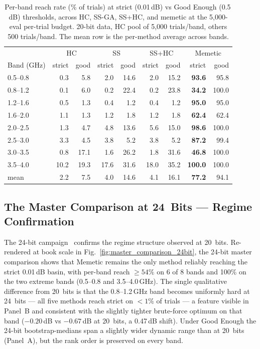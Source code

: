\begin{table}[h]
\centering
\caption[Per-band strict vs Good Enough reach rates (20-bit)]{Per-band reach rate (\% of trials) at strict (0.01\,dB)
vs Good Enough (0.5\,dB) thresholds, across HC, SS-GA, SS+HC, and
memetic at the 5{,}000-eval per-trial budget. 20-bit data, HC pool
of 5{,}000 trials/band, others 500 trials/band. The mean row is
the per-method average across bands.}
\label{tab:strict_reach_20bit}
\small
\begin{tabular}{lrrrrrrrr}
\hline
       & \multicolumn{2}{c}{HC} & \multicolumn{2}{c}{SS} & \multicolumn{2}{c}{SS+HC} & \multicolumn{2}{c}{Memetic} \\
Band (GHz) & strict & good & strict & good & strict & good & strict & good \\
\hline
0.5--0.8   & 0.3  &  5.8 & 2.0  & 14.6 & 2.0  & 15.2 & \textbf{93.6} &  95.8 \\
0.8--1.2   & 0.1  &  6.0 & 0.2  & 22.4 & 0.2  & 23.8 & \textbf{34.2} & 100.0 \\
1.2--1.6   & 0.5  &  1.3 & 0.4  &  1.2 & 0.4  &  1.2 & \textbf{95.0} &  95.0 \\
1.6--2.0   & 1.1  &  1.3 & 1.2  &  1.8 & 1.2  &  1.8 & \textbf{62.4} &  62.4 \\
2.0--2.5   & 1.3  &  4.7 & 4.8  & 13.6 & 5.6  & 15.0 & \textbf{98.6} & 100.0 \\
2.5--3.0   & 3.3  &  4.5 & 3.8  &  5.2 & 3.8  &  5.2 & \textbf{87.2} &  99.4 \\
3.0--3.5   & 0.8  & 17.1 & 1.6  & 26.2 & 1.8  & 31.6 & \textbf{46.8} & 100.0 \\
3.5--4.0   & 10.2 & 19.3 & 17.6 & 31.6 & 18.0 & 35.2 & \textbf{100.0} & 100.0 \\
\hline
mean       & 2.2  & 7.5  & 4.0  & 14.6 & 4.1  & 16.1 & \textbf{77.2} & 94.1 \\
\hline
\end{tabular}
\end{table}

\subsection{The Master Comparison at 24~Bits --- Regime Confirmation}

The 24-bit campaign~\cite{Maloney2026Paper2} confirms the regime
structure observed at 20~bits. Re-rendered at book scale in
Fig.~\ref{fig:master_comparison_24bit}, the 24-bit master
comparison shows that Memetic remains the only method reliably
reaching the strict 0.01\,dB basin, with per-band reach $\geq\!54\%$
on 6 of 8 bands and 100\% on the two extreme bands (0.5--0.8 and
3.5--4.0\,GHz). The single qualitative difference from 20~bits is
that the 0.8--1.2\,GHz band becomes uniformly hard at 24~bits ---
all five methods reach strict on $<\!1\%$ of trials --- a feature
visible in Panel~B and consistent with the slightly tighter
brute-force optimum on that band ($-0.20$\,dB vs $-0.67$\,dB at
20~bits, a 0.47\,dB shift). Under Good Enough the 24-bit
bootstrap-medians span a slightly wider dynamic range than at
20~bits (Panel~A), but the rank order is preserved on every band.

